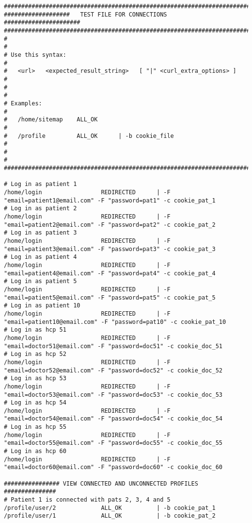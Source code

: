 \begin{verbatim}
########################################################################
###################   TEST FILE FOR CONNECTIONS   ######################
########################################################################
#                                                                      #
# Use this syntax:                                                     #
#   <url>   <expected_result_string>   [ "|" <curl_extra_options> ]    #
#                                                                      #
# Examples:                                                            #
#   /home/sitemap    ALL_OK                                            #
#   /profile         ALL_OK      | -b cookie_file                      #
#                                                                      #
########################################################################

# Log in as patient 1
/home/login					REDIRECTED		| -F "email=patient1@email.com" -F "password=pat1" -c cookie_pat_1
# Log in as patient 2
/home/login					REDIRECTED		| -F "email=patient2@email.com" -F "password=pat2" -c cookie_pat_2
# Log in as patient 3
/home/login					REDIRECTED		| -F "email=patient3@email.com" -F "password=pat3" -c cookie_pat_3
# Log in as patient 4
/home/login					REDIRECTED		| -F "email=patient4@email.com" -F "password=pat4" -c cookie_pat_4
# Log in as patient 5
/home/login					REDIRECTED		| -F "email=patient5@email.com" -F "password=pat5" -c cookie_pat_5
# Log in as patient 10
/home/login					REDIRECTED		| -F "email=patient10@email.com" -F "password=pat10" -c cookie_pat_10
# Log in as hcp 51
/home/login					REDIRECTED		| -F "email=doctor51@email.com" -F "password=doc51" -c cookie_doc_51
# Log in as hcp 52
/home/login					REDIRECTED		| -F "email=doctor52@email.com" -F "password=doc52" -c cookie_doc_52
# Log in as hcp 53
/home/login					REDIRECTED		| -F "email=doctor53@email.com" -F "password=doc53" -c cookie_doc_53
# Log in as hcp 54
/home/login					REDIRECTED		| -F "email=doctor54@email.com" -F "password=doc54" -c cookie_doc_54
# Log in as hcp 55
/home/login					REDIRECTED		| -F "email=doctor55@email.com" -F "password=doc55" -c cookie_doc_55
# Log in as hcp 60
/home/login					REDIRECTED		| -F "email=doctor60@email.com" -F "password=doc60" -c cookie_doc_60

################ VIEW CONNECTED AND UNCONNECTED PROFILES ###############
# Patient 1 is connected with pats 2, 3, 4 and 5
/profile/user/2				ALL_OK			| -b cookie_pat_1
/profile/user/1				ALL_OK			| -b cookie_pat_2


\end{verbatim}
